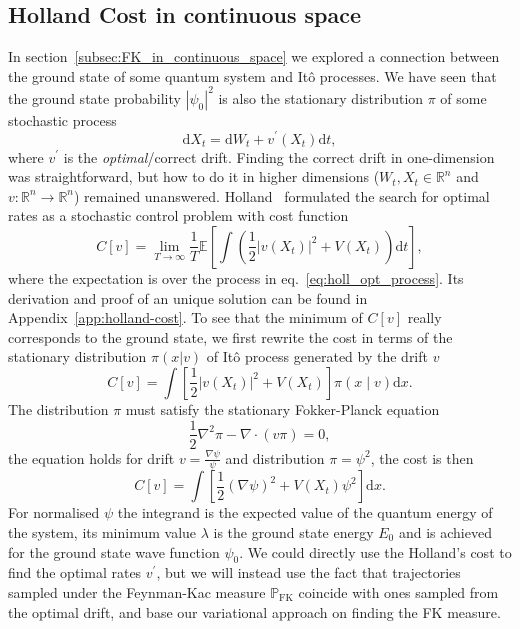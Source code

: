 \subsection{Holland Cost in continuous space}
In section~\ref{subsec:FK_in_continuous_space} we explored a connection between the ground state of some quantum system and It\^ o processes. We have seen that the ground state probability $|\psi_0|^2$ is also the stationary distribution $\pi$ of some stochastic process
\begin{equation}
	\label{eq:holl_opt_process}
	\mathrm{d} X_{t}=\mathrm{d} W_{t}+v^\prime\left(X_{t}\right) \mathrm{d} t,
\end{equation}
where $v^\prime$ is the \emph{optimal}/correct drift. Finding the correct drift in one-dimension was straightforward, but how to do it in higher dimensions ($W_{t}, X_{t} \in \mathbb{R}^n$ and $v: \mathbb{R}^n \rightarrow \mathbb{R}^n$) remained unanswered. Holland~\cite{holland1977cost} formulated the search for optimal rates as a stochastic control problem with cost function
\begin{equation}
	\label{eq:holland_cost}
	C[v]=\lim _{T \rightarrow \infty} \frac{1}{T} \mathbb{E}\left[\int \left(\frac{1}{2}\left|v\left(X_{t}\right)\right|^{2}+V\left(X_{t}\right)\right)\mathrm{d} t\right],
\end{equation}
where the expectation is over the process in eq.~\eqref{eq:holl_opt_process}. Its derivation and proof of an unique solution can be found in Appendix~\ref{app:holland-cost}. To see that the minimum of $C[v]$ really corresponds to the ground state, we first rewrite the cost in terms of the stationary distribution $\pi(x | v)$ of It\^ o process generated by the drift $v$
\begin{equation}
C[v]=\int \left[\frac{1}{2}\left|v\left(X_{t}\right)\right|^{2}+V\left(X_{t}\right)\right] \pi(x \mid v)\mathrm{d}x.
\end{equation}
The distribution $\pi$ must satisfy the stationary Fokker-Planck equation
\begin{equation}
\frac{1}{2} \nabla^{2} \pi-\nabla \cdot(v \pi)=0,
\end{equation}
the equation holds for drift $v = \frac{\nabla \psi}{\psi}$ and distribution $\pi = \psi^2$, the cost is then
\begin{equation}
C[v]=\int \left[\frac{1}{2}(\nabla \psi)^{2}+V\left(X_{t}\right) \psi^{2}\right]\mathrm{d}x.
\end{equation}
For normalised $\psi$ the integrand is the expected value of the quantum energy of the system, its minimum value $\lambda$ is the ground state energy $E_0$ and is achieved for the ground state wave function $\psi_{0}$. We could directly use the Holland's cost to find the optimal rates $v^\prime$, but we will instead use the fact that trajectories sampled under the Feynman-Kac measure $\mathbb{P}_{\mathrm{FK}}$ coincide with ones sampled from the optimal drift, and base our variational approach on finding the FK measure.


